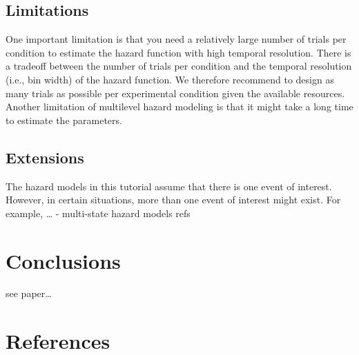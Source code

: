 \documentclass[
  man,floatsintext]{apa6}
\begin{document}
\subsection{Limitations}\label{limitations}

One important limitation is that you need a relatively large number of trials per condition to estimate the hazard function with high temporal resolution. There is a tradeoff between the number of trials per condition and the temporal resolution (i.e., bin width) of the hazard function. We therefore recommend to design as many trials as possible per experimental condition given the available resources.
Another limitation of multilevel hazard modeling is that it might take a long time to estimate the parameters.

\subsection{Extensions}\label{extensions}

The hazard models in this tutorial assume that there is one event of interest. However, in certain situations, more than one event of interest might exist. For example, \ldots{} - multi-state hazard models refs

\section{Conclusions}\label{conclusions}

see paper\ldots{}

\newpage

\section{References}\label{references}
\end{document}
